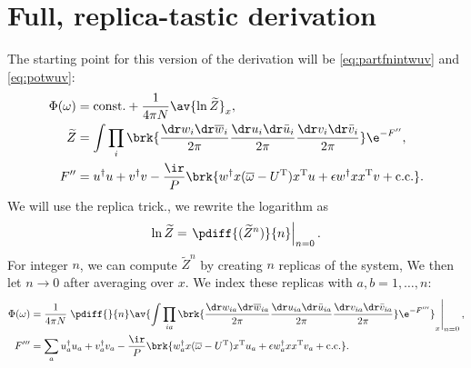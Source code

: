 \documentclass[12pt]{article}
\newcommand{\dg}{^\dagger}
\newcommand{\trans}{^\mathrm{T}}
\newcommand{\omb}{\overline{\omega}}
\newcommand{\dw}{\dr w}
\newcommand{\dwb}{\dr\overline{w}}
\newcommand{\du}{\dr u}
\newcommand{\dub}{\dr\bar{u}}
\newcommand{\dv}{\dr v}
\newcommand{\dvb}{\dr\bar{v}}
\begin{document}
%






\section{Full, replica-tastic derivation}\label{sec:replicader}


The starting point for this version of the derivation will be \eqref{eq:partfnintwuv} and \eqref{eq:potwuv}:
%
\begin{equation}\label{eq:phiint}
  \begin{aligned}
    \Phi(\omega) &= \text{const.} + \frac{1}{4\pi N} \av{\ln \widetilde{Z}}_x, \\
    \widetilde{Z} &= \int \prod_i\brk{ \frac{\dw_i\dwb_i}{2\pi} \frac{\du_i\dub_i}{2\pi} \frac{\dv_i\dvb_i}{2\pi} } \e^{-F''}, \\
    F'' &=  u\dg u + v\dg v -\frac{\ir}{P}\brk{ w\dg x(\omb-U\trans)x\trans u + \epsilon w\dg xx\trans v + \text{c.c.} }.
  \end{aligned}
\end{equation}
%
We will use the replica trick., \ie we rewrite the logarithm as
%
\begin{equation}\label{eq:replicatrick}
  \ln \widetilde{Z} = \left. \pdiff{( \widetilde{Z}^n )}{n}\right\rvert_{n=0}. 
\end{equation}
%
For integer $n$, we can compute $\widetilde{Z}^n$ by creating $n$ replicas of the system,
We then let $n\to0$ after averaging over $x$.
We index these replicas with $a,b=1,\ldots,n$:
%
\begin{equation}\label{eq:phirep}
    \begin{aligned}
    \Phi(\omega) &= \frac{1}{4\pi N}  \left.\pdiff{}{n}\av{
       \int \prod_{ia}\brk{ \frac{\dw_{ia}\dwb_{ia}}{2\pi} \frac{\du_{ia}\dub_{ia}}{2\pi} \frac{\dv_{ia}\dvb_{ia}}{2\pi} } \e^{-F'''}
       }_x\right\rvert_{n=0}, \\
    F''' &= \sum_a  u_a\dg u_a + v_a\dg v_a -\frac{\ir}{P}\brk{ w_a\dg x(\omb-U\trans)x\trans u_a + \epsilon w_a\dg xx\trans v_a + \text{c.c.} }.
  \end{aligned}
\end{equation}
%
\end{document}
